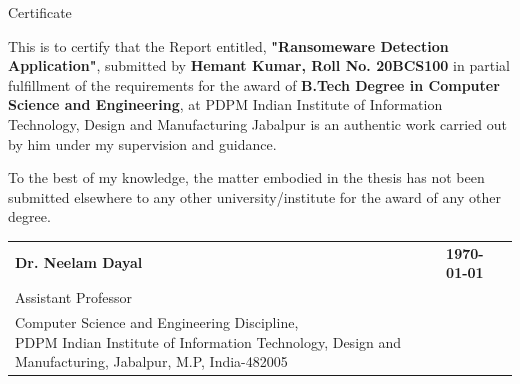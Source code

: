 \documentclass[12pt,letterpaper]{article}
\begin{document}
\newpage
    \begin{center}
        \vspace*{1cm}
        {\englishtowne \LARGE Certificate}
        
        \vspace{1.2cm}
        
       \large This is to certify that the Report entitled, \textbf{"Ransomeware Detection Application"}, submitted by \textbf{Hemant Kumar, Roll No. 20BCS100} in partial fulfillment of the requirements for the award of \textbf{ B.Tech Degree in Computer Science and Engineering}, at PDPM Indian Institute of Information Technology, Design and Manufacturing Jabalpur is an authentic work carried out by him under my supervision and guidance.
    
    
        To the best of my knowledge, the matter embodied in the thesis has not been submitted elsewhere to any other university/institute for the award of any other degree.
        
        \vfill %

         
    \noindent
    \begin{tabular}{@{}ll@{}}
        \textbf{Dr. Neelam Dayal} & \hfill\textbf{{{\today}}} \\
        \large Assistant Professor & \\
        \parbox[t]{0.7\textwidth}{%
            Computer Science and Engineering Discipline, \\
            PDPM Indian Institute of Information Technology, Design and Manufacturing, Jabalpur, M.P, India-482005
        }
    \end{tabular}



       \vspace{2cm}
        
    \end{center}
    
\end{document}
